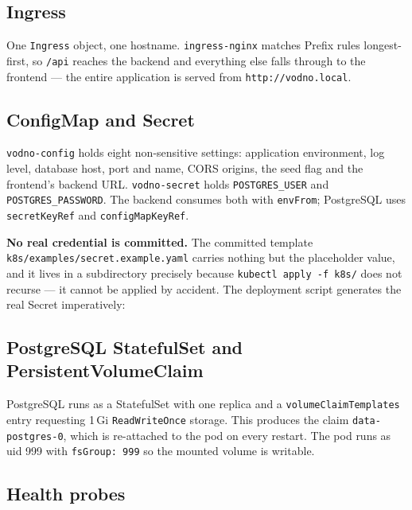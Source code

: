 \documentclass[10pt,a4paper]{article}
\newcommand{\cd}[1]{\texttt{\small #1}}
\begin{document}
\subsection{Ingress}

One \cd{Ingress} object, one hostname. \cd{ingress-nginx} matches Prefix rules
longest-first, so \cd{/api} reaches the backend and everything else falls
through to the frontend --- the entire application is served from
\cd{http://vodno.local}.

\subsection{ConfigMap and Secret}

\cd{vodno-config} holds eight non-sensitive settings: application environment,
log level, database host, port and name, CORS origins, the seed flag and the
frontend's backend URL. \cd{vodno-secret} holds \cd{POSTGRES\_USER} and
\cd{POSTGRES\_PASSWORD}. The backend consumes both with \cd{envFrom};
PostgreSQL uses \cd{secretKeyRef} and \cd{configMapKeyRef}.

\textbf{No real credential is committed.} The committed template
\cd{k8s/examples/secret.example.yaml} carries nothing but the placeholder
value, and it lives in a subdirectory precisely because
\cd{kubectl apply -f k8s/} does not recurse --- it cannot be applied by
accident. The deployment script generates the real Secret imperatively:


\subsection{PostgreSQL StatefulSet and PersistentVolumeClaim}

PostgreSQL runs as a StatefulSet with one replica and a
\cd{volumeClaimTemplates} entry requesting 1\,Gi \cd{ReadWriteOnce} storage.
This produces the claim \cd{data-postgres-0}, which is re-attached to the pod
on every restart. The pod runs as uid 999 with \cd{fsGroup: 999} so the
mounted volume is writable.

\subsection{Health probes}
\end{document}
